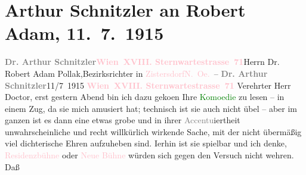 

               \section[Arthur Schnitzler an Robert Adam, 11. 7. 1915]{ Arthur Schnitzler an Robert Adam, 11. 7. 1915}\nopagebreak{}\rehead{ }\normalsize\beginnumbering{} \toendnotes[C]{\smallbreak\pagebreak[2]} 
\toendnotes[C]{\smallbreak}\pstart{}{\pb}\textcolor{gray}{\textbf{Dr. Arthur Schnitzler}}\pend{}\pstart{}\textcolor{gray}{\textbf{\textcolor{pink}{Wien XVIII. Sternwartestrasse 71}{}\ledrightnote{\textcolor{pink}{Sternwartestraße}}}}\pend{}{\bigskip}\pstart{}{\pb}Herrn Dr. Robert Adam
                        Pollak,\pend{}\pstart{}Bezirksrichter in \textcolor{pink}{Zistersdorf}{}\ledrightnote{\textcolor{pink}{Zistersdorf}}\pend{}\pstart{}\textcolor{pink}{N. Oe.}{}\ledrightnote{\textcolor{pink}{Niederösterreich}} –
                    \pend{}{\bigskip}\pstart
           \noindent{}{\pb}\textcolor{gray}{\textbf{Dr. Arthur Schnitzler}}\hfill 11/7 1915\pend
           \pstart
           \textcolor{gray}{\textbf{\textcolor{pink}{Wien XVIII. Sternwartestrasse 71}{}\ledrightnote{\textcolor{pink}{Sternwartestraße}}}}\pend
           \pstart
           Verehrter Herr Doctor, erst gestern Abend bin ich dazu geko{\geminationm}en Ihre \textcolor{green}{Komoedie}{} zu lesen – in einem Zug, da sie mich
                    amusiert hat; technisch ist sie auch nicht übel – aber im ganzen ist es dann
                    eine etwas grobe und in ihrer \textcolor{gray}{Accentu}iertheit
                    unwahrscheinliche und recht willkürlich wirkende Sache, mit der nicht übermäßig
                        \introOben{}viel\introOben{} dichterische Ehren aufzuheben sind. I{\geminationm}erhin ist sie spielbar und ich denke, \textcolor{pink}{Residenzbühne}{}\ledrightnote{\textcolor{pink}{Kammerspiele Wien}} oder \textcolor{pink}{Neue Bühne}{}\ledrightnote{\textcolor{pink}{Neue Wiener Bühne}} würden sich gegen den Versuch nicht wehren. Daß
